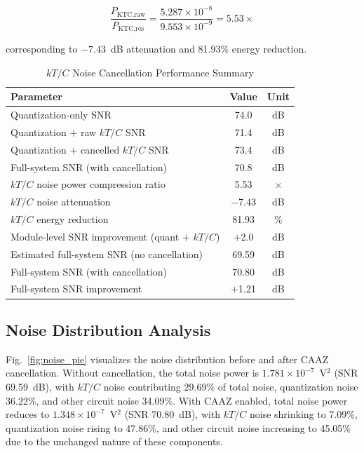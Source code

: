 \documentclass[journal]{IEEEtran}
\begin{document}
\begin{equation}
\frac{P_{\text{KTC,raw}}}{P_{\text{KTC,res}}} = \frac{5.287 \times 10^{-8}}{9.553 \times 10^{-9}} = 5.53\times
\end{equation}

corresponding to $-7.43$~dB attenuation and 81.93\% energy reduction.

\begin{table}[!t]
\centering
\caption{$kT/C$ Noise Cancellation Performance Summary}
\label{tab:ktc_summary}
\begin{tabular}{|l|c|c|}
\hline
\textbf{Parameter} & \textbf{Value} & \textbf{Unit} \\
\hline
Quantization-only SNR & 74.0 & dB \\
Quantization $+$ raw $kT/C$ SNR & 71.4 & dB \\
Quantization $+$ cancelled $kT/C$ SNR & 73.4 & dB \\
Full-system SNR (with cancellation) & 70.8 & dB \\
\hline
$kT/C$ noise power compression ratio & 5.53 & $\times$ \\
$kT/C$ noise attenuation & $-$7.43 & dB \\
$kT/C$ energy reduction & 81.93 & \% \\
Module-level SNR improvement (quant $+$ $kT/C$) & $+$2.0 & dB \\
Estimated full-system SNR (no cancellation) & 69.59 & dB \\
Full-system SNR (with cancellation) & 70.80 & dB \\
Full-system SNR improvement & $+$1.21 & dB \\
\hline
\end{tabular}
\end{table}

\subsection{Noise Distribution Analysis}

Fig.~\ref{fig:noise_pie} visualizes the noise distribution before and after CAAZ cancellation. Without cancellation, the total noise power is $1.781 \times 10^{-7}$~V$^2$ (SNR 69.59~dB), with $kT/C$ noise contributing 29.69\% of total noise, quantization noise 36.22\%, and other circuit noise 34.09\%. With CAAZ enabled, total noise power reduces to $1.348 \times 10^{-7}$~V$^2$ (SNR 70.80~dB), with $kT/C$ noise shrinking to 7.09\%, quantization noise rising to 47.86\%, and other circuit noise increasing to 45.05\% due to the unchanged nature of these components.
\end{document}
